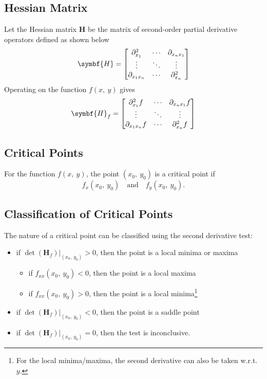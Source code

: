 \documentclass{article}
\begin{document}
\subsection{Hessian Matrix}
\begin{definition}
    Let the Hessian matrix $\symbf{H}$ be the matrix of second-order partial
    derivative operators defined as shown below
    \begin{equation*}
        \symbf{H} =
        \mqty[
            \partial^2_{x_1} & \cdots & \partial_{x_nx_1} \\
            \vdots & \ddots & \vdots \\
            \partial_{x_1x_n} & \cdots & \partial^2_{x_n}
        ]
    \end{equation*}
    Operating on the function $f(x,\: y)$ gives
    \begin{equation*}
        \symbf{H}_f =
        \mqty[
            \partial^2_{x_1}f & \cdots & \partial_{x_nx_1}f \\
            \vdots & \ddots & \vdots \\
            \partial_{x_1x_n}f & \cdots & \partial^2_{x_n}f
        ]
    \end{equation*}
\end{definition}
\subsection{Critical Points}
For the function $f(x,\: y)$, the point $(x_0,\: y_0)$ is a critical point if
\begin{equation*}
    f_x(x_0,\: y_0) \quad \text{and} \quad f_y(x_0,\: y_0).
\end{equation*}
\subsection{Classification of Critical Points}
The nature of a critical point can be classified using the second derivative test:
\begin{itemize}
    \item if $\left.\det{\left(\mathbf{H}_f\right)}\right|_{(x_0,\: y_0)} > 0$, then the point is a local minima or maxima
    \begin{itemize}
        \item if $f_{xx}(x_0, \: y_0) < 0$, then the point is a local maxima
        \item if $f_{xx}(x_0, \: y_0) > 0$, then the point is a local minima\footnote[1]{For the local minima/maxima, the second derivative can also be taken w.r.t. $y$.}
    \end{itemize}
    \item if $\left.\det{\left(\mathbf{H}_f\right)}\right|_{(x_0,\: y_0)} < 0$, then the point is a saddle point
    \item if $\left.\det{\left(\mathbf{H}_f\right)}\right|_{(x_0,\: y_0)} = 0$, then the test is inconclusive.
\end{itemize}
\newpage
\end{document}
